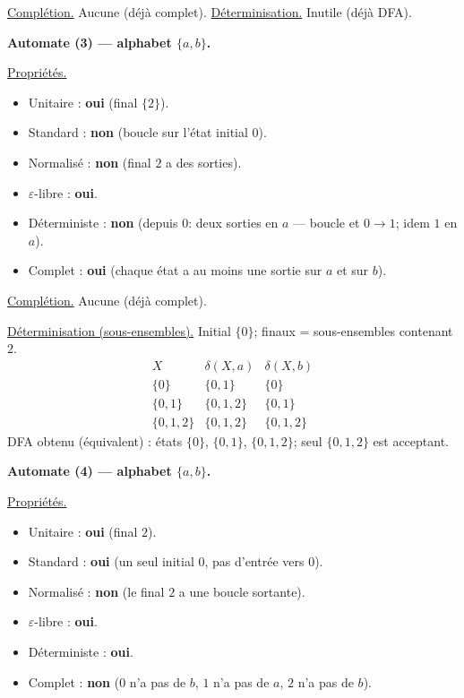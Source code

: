 \begin{corrections}
\begin{questions}
    \underline{Complétion.} Aucune (déjà complet).
    \underline{Déterminisation.} Inutile (déjà DFA).

    \medskip

  \item \textbf{Automate (3) — alphabet $\{a,b\}$.}

    \underline{Propriétés.}
    \begin{itemize}
    \item Unitaire : \textbf{oui} (final $\{2\}$).
    \item Standard : \textbf{non} (boucle sur l’état initial $0$).
    \item Normalisé : \textbf{non} (final $2$ a des sorties).
    \item $\varepsilon$-libre : \textbf{oui}.
    \item Déterministe : \textbf{non} (depuis $0$: deux sorties en $a$ — boucle et $0\to1$; idem $1$ en $a$).
    \item Complet : \textbf{oui} (chaque état a au moins une sortie sur $a$ et sur $b$).
    \end{itemize}

    \underline{Complétion.} Aucune (déjà complet).

    \underline{Déterminisation (sous-ensembles).}
    Initial $\{0\}$; finaux = sous-ensembles contenant $2$.
    \[
    \renewcommand{\arraystretch}{1.2}
    \begin{array}{c|c|c}
      X & \delta(X,a) & \delta(X,b)\\\hline
      \{0\}     & \{0,1\}   & \{0\}\\
      \{0,1\}   & \{0,1,2\} & \{0,1\}\\
      \{0,1,2\} & \{0,1,2\} & \{0,1,2\}
    \end{array}
    \]
    DFA obtenu (équivalent) : états $\{0\}$, $\{0,1\}$, $\{0,1,2\}$; seul $\{0,1,2\}$ est acceptant.

    \medskip

  \item \textbf{Automate (4) — alphabet $\{a,b\}$.}

    \underline{Propriétés.}
    \begin{itemize}
    \item Unitaire : \textbf{oui} (final $2$).
    \item Standard : \textbf{oui} (un seul initial $0$, pas d’entrée vers $0$).
    \item Normalisé : \textbf{non} (le final $2$ a une boucle sortante).
    \item $\varepsilon$-libre : \textbf{oui}.
    \item Déterministe : \textbf{oui}.
    \item Complet : \textbf{non} ($0$ n’a pas de $b$, $1$ n’a pas de $a$, $2$ n’a pas de $b$).
    \end{itemize}


\end{questions}
\end{corrections}
